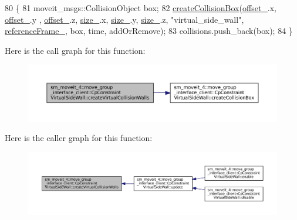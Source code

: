 \begin{DoxyCode}
80         \{
81             moveit\_msgs::CollisionObject box;
82             \hyperlink{classsm__moveit__4_1_1move__group__interface__client_1_1CpConstraintVirtualSideWall_a7522d984f70a916e649490dc19fab610}{createCollisionBox}(\hyperlink{classsm__moveit__4_1_1move__group__interface__client_1_1CpConstraintVirtualSideWall_a5bf697ee83d01d56871552148b4a3004}{offset\_}.x, \hyperlink{classsm__moveit__4_1_1move__group__interface__client_1_1CpConstraintVirtualSideWall_a5bf697ee83d01d56871552148b4a3004}{offset\_}.y , 
      \hyperlink{classsm__moveit__4_1_1move__group__interface__client_1_1CpConstraintVirtualSideWall_a5bf697ee83d01d56871552148b4a3004}{offset\_}.z, \hyperlink{classsm__moveit__4_1_1move__group__interface__client_1_1CpConstraintVirtualSideWall_aa460120f216e58206aaec0cf864ad55b}{size\_}.x, \hyperlink{classsm__moveit__4_1_1move__group__interface__client_1_1CpConstraintVirtualSideWall_aa460120f216e58206aaec0cf864ad55b}{size\_}.y, \hyperlink{classsm__moveit__4_1_1move__group__interface__client_1_1CpConstraintVirtualSideWall_aa460120f216e58206aaec0cf864ad55b}{size\_}.z, \textcolor{stringliteral}{"virtual\_side\_wall"}, 
      \hyperlink{classsm__moveit__4_1_1move__group__interface__client_1_1CpConstraintVirtualSideWall_a9eebbc3d7b58367c509ec93eae81b2b0}{referenceFrame\_}, box, time, addOrRemove);
83             collisions.push\_back(box);
84         \}
\end{DoxyCode}
Here is the call graph for this function\+:
\nopagebreak
\begin{figure}[H]
\begin{center}
\leavevmode
\includegraphics[width=350pt]{classsm__moveit__4_1_1move__group__interface__client_1_1CpConstraintVirtualSideWall_a43db5b598dd9ce057517188f2350f33d_cgraph}
\end{center}
\end{figure}
Here is the caller graph for this function\+:
\nopagebreak
\begin{figure}[H]
\begin{center}
\leavevmode
\includegraphics[width=350pt]{classsm__moveit__4_1_1move__group__interface__client_1_1CpConstraintVirtualSideWall_a43db5b598dd9ce057517188f2350f33d_icgraph}
\end{center}
\end{figure}
